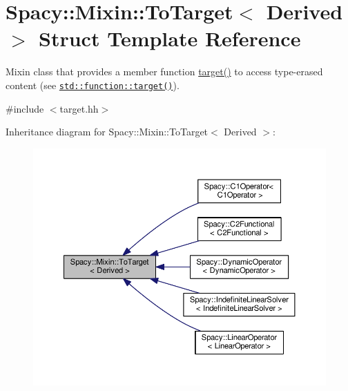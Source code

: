 \hypertarget{structSpacy_1_1Mixin_1_1ToTarget}{}\section{Spacy\+:\+:Mixin\+:\+:To\+Target$<$ Derived $>$ Struct Template Reference}
\label{structSpacy_1_1Mixin_1_1ToTarget}


Mixin class that provides a member function \hyperlink{structSpacy_1_1Mixin_1_1ToTarget_a3510786172c63a074eda127276d13392}{target()} to access type-\/erased content (see \href{http://en.cppreference.com/w/cpp/utility/functional/function/target}{\tt std\+::function\+::target()}).  




{\ttfamily \#include $<$target.\+hh$>$}



Inheritance diagram for Spacy\+:\+:Mixin\+:\+:To\+Target$<$ Derived $>$\+:\nopagebreak
\begin{figure}[H]
\begin{center}
\leavevmode
\includegraphics[width=350pt]{structSpacy_1_1Mixin_1_1ToTarget__inherit__graph}
\end{center}
\end{figure}
